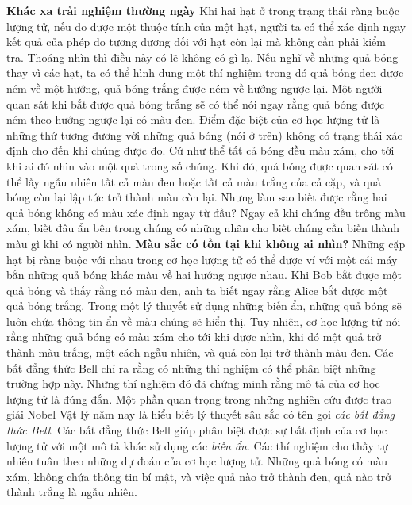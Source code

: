 \begin{multicols}{2}
	\vskip 0.1cm
	\textbf{\color{timhieukhoahoc}Khác xa trải nghiệm thường ngày}
	\vskip 0.1cm
	Khi hai hạt ở trong trạng thái ràng buộc lượng tử, nếu đo được một thuộc tính của một hạt, người ta có thể xác định ngay kết quả của phép đo tương đương đối với hạt còn lại mà không cần phải kiểm tra.
	\vskip 0.1cm
	Thoáng nhìn thì điều này có lẽ không có gì lạ. Nếu nghĩ về những quả bóng thay vì các hạt, ta có thể hình dung một thí nghiệm trong đó quả bóng đen được ném về một hướng, quả bóng trắng được ném về hướng ngược lại. Một người quan sát khi bắt được quả bóng trắng sẽ có thể nói ngay rằng quả bóng được ném theo hướng ngược lại có màu đen.
	\vskip 0.1cm
	Điểm đặc biệt của cơ học lượng tử là những thứ tương đương với những quả bóng (nói ở trên) không có trạng thái xác định cho đến khi chúng được đo. Cứ như thể tất cả bóng đều màu xám, cho tới khi ai đó nhìn vào một quả trong số chúng. Khi đó, quả bóng được quan sát có thể lấy ngẫu nhiên tất cả màu đen hoặc tất cả màu trắng của cả cặp, và quả bóng còn lại lập tức trở thành màu còn lại.
	\vskip 0.1cm
	Nhưng làm sao biết được rằng hai quả bóng không có màu xác định ngay từ đầu? Ngay cả khi chúng đều trông màu xám, biết đâu ẩn bên trong chúng có những nhãn cho biết chúng cần biến thành màu gì khi có người nhìn.
	\vskip 0.1cm
	\textbf{\color{timhieukhoahoc}Màu sắc có tồn tại khi không ai nhìn?}
	\vskip 0.1cm
	Những cặp hạt bị ràng buộc với nhau trong cơ học lượng tử có thể được ví với một cái máy bắn những quả bóng khác màu về hai hướng ngược nhau. Khi Bob bắt được một quả bóng và thấy rằng nó màu đen, anh ta biết ngay rằng Alice bắt được một quả bóng trắng. Trong một lý thuyết sử dụng những biến ẩn, những quả bóng sẽ luôn chứa thông tin ẩn về màu chúng sẽ hiển thị. Tuy nhiên, cơ học lượng tử nói rằng những quả bóng có màu xám cho tới khi được nhìn, khi đó một quả trở thành màu trắng, một cách ngẫu nhiên, và quả còn lại trở thành màu đen. Các bất đẳng thức Bell chỉ ra rằng có những thí nghiệm có thể phân biệt những trường hợp này. Những thí nghiệm đó đã chứng minh rằng mô tả của cơ học lượng tử là đúng đắn.
	\vskip 0.1cm
	Một phần quan trọng trong những nghiên cứu được trao giải Nobel Vật lý năm nay là hiểu biết lý thuyết sâu sắc có tên gọi \textit{các bất đẳng thức Bell}. Các bất đẳng thức Bell giúp phân biệt được sự bất định của cơ học lượng tử với một mô tả khác sử dụng các \textit{biến ẩn}. Các thí nghiệm cho thấy tự nhiên tuân theo những dự đoán của cơ học lượng tử. Những quả bóng có màu xám, không chứa thông tin bí mật, và việc quả nào trở thành đen, quả nào trở thành trắng là ngẫu nhiên.
	\begin{figure}[H]

\end{figure}
\end{multicols}
